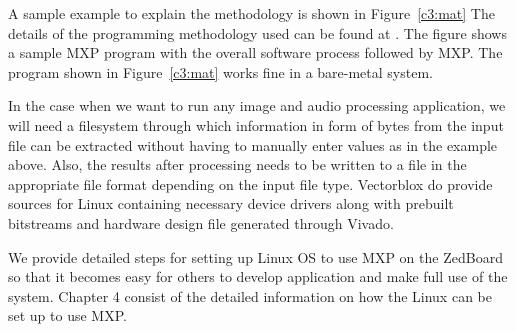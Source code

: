 A sample example to explain the methodology is shown in Figure~\ref{c3:mat} The details of the programming methodology used can be found at \cite{20}. The figure shows a sample MXP program with the overall software process followed by MXP. The program shown in Figure~\ref{c3:mat} works fine in a bare-metal system. 


In the case when we want to run any image and audio processing application, we will need a filesystem through which information in form of bytes from the input file can be extracted without having to manually enter values as in the example above. Also, the results after processing needs to be written to a file in the appropriate file format depending on the input file type. Vectorblox do provide sources for Linux containing necessary device drivers along with prebuilt bitstreams and hardware design file generated through Vivado.

We provide detailed steps for setting up Linux OS to use MXP on the ZedBoard so that it becomes easy for others to develop application and make full use of the system. Chapter 4 consist of the detailed information on how the Linux can be set up to use MXP.

